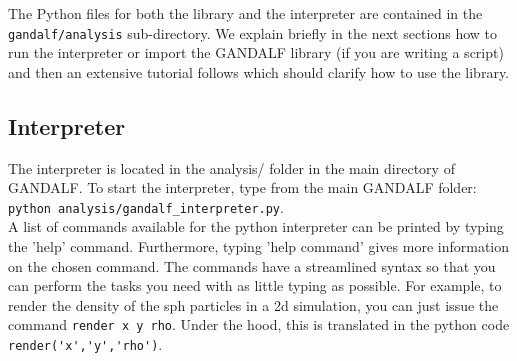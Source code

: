 \documentclass[a4paper]{article}
\newcommand{\var}[1]{\texttt{#1}}
\begin{document}
The Python files for both the library and the interpreter are contained in the \var{gandalf/analysis} sub-directory. We explain briefly in the next sections how to run the interpreter or import the GANDALF library (if you are writing a script) and then an extensive tutorial follows which should clarify how to use the library.

\subsection{Interpreter}

The interpreter is located in the analysis/ folder in the main directory of GANDALF.
To start the interpreter, type from the main GANDALF folder:\\
\newline
\noindent \var{python analysis/gandalf\_interpreter.py}. \\
\newline
A list of commands available for the python interpreter can be printed by typing the 'help' command.  Furthermore, typing 'help command' gives more information on the chosen command.  The commands have a streamlined syntax so that you can perform the tasks you need with as little typing as possible. For example, to render the density of the sph particles in a 2d simulation, you can just issue the command \var{render x y rho}. Under the hood, this is translated in the python code \lstinline[columns=fixed]{render('x','y','rho')}.




\end{document}
